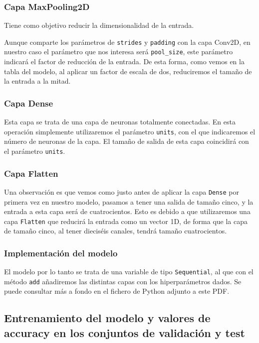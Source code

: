 \documentclass[12pt, spanish]{article}
\begin{document}
\subsubsection{Capa MaxPooling2D}

Tiene como objetivo reducir la dimensionalidad de la entrada.

Aunque comparte los parámetros de \texttt{strides} y \texttt{padding} con la capa Conv2D, en nuestro caso el parámetro que nos interesa será \texttt{pool\_size}, este parámetro indicará el factor de reducción de la entrada. De esta forma, como vemos en la tabla del modelo, al aplicar un factor de escala de dos, reduciremos el tamaño de la entrada a la mitad.


\subsubsection{Capa Dense}

Esta capa se trata de una capa de neuronas totalmente conectadas. En esta operación simplemente utilizaremos el parámetro \texttt{units}, con el que indicaremos el número de neuronas de la capa. El tamaño de salida de esta capa coincidirá con el parámetro \texttt{units}.


\subsubsection{Capa Flatten}


Una observación es que vemos como justo antes de aplicar la capa \texttt{Dense} por primera vez en nuestro modelo, pasamos a tener una salida de tamaño cinco, y la entrada a esta capa será de cuatrocientos. Esto es debido a que utilizaremos una capa \texttt{Flatten}\cite{flatten} que reducirá la entrada como un vector 1D, de forma que la capa de tamaño cinco, al tener dieciséis canales, tendrá tamaño cuatrocientos.


\subsubsection{Implementación del modelo}

El modelo por lo tanto se trata de una variable de tipo \texttt{Sequential}, al que con el método \texttt{add} añadiremos las distintas capas con los hiperparámetros dados. Se puede consultar más a fondo en el fichero de Python adjunto a este PDF.


\subsection{Entrenamiento del modelo y valores de accuracy en los conjuntos de validación y test}
\end{document}
